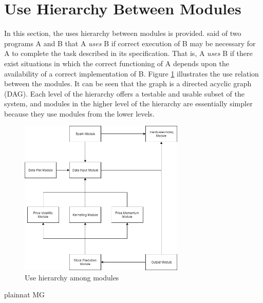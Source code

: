 \documentclass[12pt, titlepage]{article}
\begin{document}
\section{Use Hierarchy Between Modules} \label{SecUse}

In this section, the uses hierarchy between modules is
provided. \citet{Parnas1978} said of two programs A and B that A {\em uses} B if
correct execution of B may be necessary for A to complete the task described in
its specification. That is, A {\em uses} B if there exist situations in which
the correct functioning of A depends upon the availability of a correct
implementation of B. Figure \ref{FigUH} illustrates the use relation between
the modules. It can be seen that the graph is a directed acyclic graph
(DAG). Each level of the hierarchy offers a testable and usable subset of the
system, and modules in the higher level of the hierarchy are essentially simpler
because they use modules from the lower levels.

\begin{figure}[H]
\centering
\includegraphics[width=0.7\textwidth]{UsesHierarchy.png}

\caption{Use hierarchy among modules}
\label{FigUH}
\end{figure}



 {plainnat}
 {MG}
\end{document}
